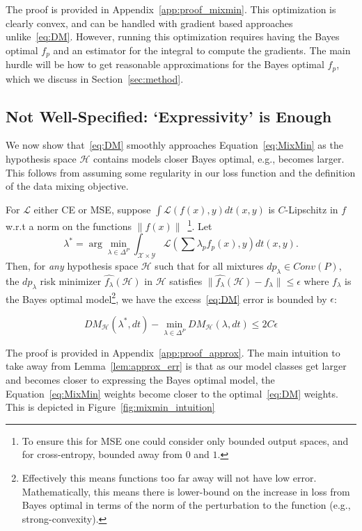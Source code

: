 The proof is provided in Appendix~\ref{app:proof_mixmin}. This optimization is clearly convex, and can be handled with gradient based approaches unlike~\ref{eq:DM}. However, running this optimization requires having the Bayes optimal $f_p$ and an estimator for the integral to compute the gradients. The main hurdle will be how to get reasonable approximations for the Bayes optimal $f_p$, which we discuss in Section~\ref{sec:method}. 






\subsection{Not Well-Specified: `Expressivity' is Enough}



We now show that~\ref{eq:DM} smoothly approaches Equation~\ref{eq:MixMin} as the hypothesis space $\mathcal{H}$ contains models closer Bayes optimal, e.g., becomes larger. This follows from assuming some regularity in our loss function and the definition of the data mixing objective.



\begin{lemma}
\label{lem:approx_err}
    For $\mathcal{L}$ either CE or MSE, suppose $\int \mathcal{L}(f(x),y) dt(x,y)$ is $C$-Lipschitz in $f$ w.r.t a norm on the functions $\|f(x)\|$~\footnote{To ensure this for MSE one could consider only bounded output spaces, and for cross-entropy, bounded away from $0$ and $1$.}. Let
    \begin{equation*}
    \lambda^* =  \arg\min_{\lambda \in \Delta^{P}} \int_{\mathcal{X} \times \mathcal{Y}} \mathcal{L}\left(\sum \lambda_p f_p(x),y\right) dt(x,y).
\end{equation*}
    Then, for \emph{any} hypothesis space $\mathcal{H}$ such that for all mixtures $dp_{\lambda} \in Conv(P)$, the $dp_{\lambda}$ risk minimizer $\hat{f_{\lambda}}(\mathcal{H})$ in $\mathcal{H}$ satisfies $\|\hat{f_\lambda}(\mathcal{H}) - f_{\lambda}\| \leq \epsilon$ where $f_\lambda$ is the Bayes optimal model\footnote{Effectively this means functions too far away will not have low error. Mathematically, this means there is lower-bound on the increase in loss from Bayes optimal in terms of the norm of the perturbation to the function (e.g., strong-convexity).},
we have the excess~\ref{eq:DM} error is bounded by $\epsilon$: %

    \begin{equation}
    \label{eq:DM_MixMin_err}
        DM_{\mathcal{H}}(\lambda^*, dt) - \min_{\lambda \in \Delta^P} DM_{\mathcal{H}}(\lambda, dt) \leq 2C\epsilon %
    \end{equation}
\end{lemma}



The proof is provided in Appendix~\ref{app:proof_approx}. The main intuition to take away from Lemma~\ref{lem:approx_err} is that as our model classes get larger and becomes closer to expressing the Bayes optimal model, the Equation~\ref{eq:MixMin} weights become closer to the optimal~\ref{eq:DM} weights. This is depicted in Figure~\ref{fig:mixmin_intuition}

